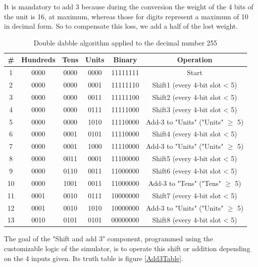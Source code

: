 \documentclass{article}
\begin{document}
It is mandatory to add 3 because during the conversion the weight of the 4 bits of the unit is 16, at maximum, whereas those for digits represent a maximum of 10 in decimal form. So to compensate this loss, we add a half of the lost weight.

\begin{table}[h]
  \centering
  \begin{tabular}{||c|c|c|c||c||c||}
    \hline
    \# & Hundreds & Tens & Units & Binary & Operation \\
    \hline
    1 & 0000 & 0000 & 0000 & 11111111 & Start \\
    2 & 0000 & 0000 & 0001 & 11111110 & Shift1 (every 4-bit slot < 5) \\
    3 & 0000 & 0000 & 0011 & 11111100 & Shift2 (every 4-bit slot < 5) \\ 
    4 & 0000 & 0000 & 0111 & 11111000 & Shift3 (every 4-bit slot < 5) \\
    5 & 0000 & 0000 & 1010 & 11110000 & Add-3 to "Units" ("Units" $\geq$ 5)\\
    6 & 0000 & 0001 & 0101 & 11110000 & Shift4 (every 4-bit slot < 5) \\
    7 & 0000 & 0001 & 1000 & 11110000 & Add-3 to "Units" ("Units" $\geq$ 5)\\
    8 & 0000 & 0011 & 0001 & 11100000 & Shift5 (every 4-bit slot < 5) \\
    9 & 0000 & 0110 & 0011 & 11000000 & Shift6 (every 4-bit slot < 5) \\
    10 & 0000 & 1001 & 0011& 11000000 & Add-3 to "Tens" ("Tens" $\geq$ 5)\\
    11 & 0001 & 0010 & 0111& 10000000 & Shift7 (every 4-bit slot < 5) \\
    12 & 0001 & 0010 & 1010& 10000000 & Add-3 to "Units" ("Units" $\geq$ 5)\\
    13 & 0010 & 0101 & 0101& 00000000 & Shift8 (every 4-bit slot < 5) \\
    \hline
  \end{tabular}
    \label{SC_Algo}
    \caption{Double dabble algorithm applied to the decimal number 255}

  \end{table}


The goal of the "Shift and add 3" component, programmed using the customizable logic of the simulator, is to operate this shift or addition depending on the 4 inputs given. Its truth table is figure \ref{Add3Table}.
\end{document}
